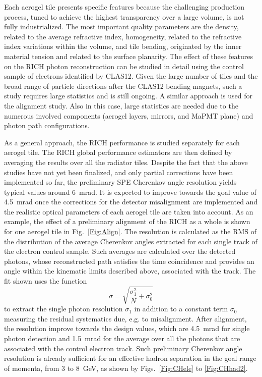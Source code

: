 \documentclass[5p,times,twocolumn]{elsarticle}
\begin{document}
Each aerogel tile presents specific features because the challenging production process, tuned to achieve the
highest transparency over a large volume, is not fully industrialized. The most important quality parameters are the
density, related to the average refractive index, homogeneity, related to the refractive index variations within the
volume, and tile bending, originated by the inner material tension and related to the surface planarity. The effect of
these features on the RICH photon reconstruction can be studied in detail using the control sample of electrons
identified by CLAS12. Given the large number of tiles and the broad range of particle directions after the CLAS12
bending magnets, such a study requires large statistics and is still ongoing. A similar approach is used for the
alignment study. Also in this case, large statistics are needed due to the numerous involved components (aerogel
layers, mirrors, and MaPMT plane) and photon path configurations. 

As a general approach, the RICH performance is studied separately for each aerogel tile.
The RICH global performance estimators are then defined by averaging the results over all the
radiator tiles. 
Despite the fact that the above studies have not yet been finalized, and only partial corrections have been
implemented so far, the preliminary SPE Cherenkov angle resolution yields typical values around 6~mrad. It is expected to improve
towards the goal value of 4.5~mrad once the corrections for the detector misalignment are implemented and the
realistic optical parameters of each aerogel tile are taken into account. As an example, the effect of a preliminary
alignment of the RICH as a whole is shown for one aerogel tile in Fig.~\ref{Fig:Align}. The
resolution is calculated as the RMS of the distribution of the average Cherenkov angles extracted for 
each single track of the electron control sample. Such averages are calculated 
over the detected photons, whose reconstructed path satisfies the time coincidence and provides an angle within the 
kinematic limits described above, associated with the track. The fit shown uses the function
$$\sigma = \sqrt{\frac{\sigma_1^2}{N}+\sigma_0^2}$$ to extract the single photon resolution $\sigma_1$ in addition to
a constant term $\sigma_0$ measuring the residual systematics due, e.g. to misalignment.
After alignment, the resolution improve towards
the design values, which are 4.5~mrad for single photon detection and 1.5~mrad for the average over all the photons 
that are associated with the control electron track. Such preliminary Cherenkov angle resolution is already sufficient for an effective hadron
separation in the goal range of momenta, from 3 to 8~GeV, as shown by Figs.~\ref{Fig:CHele} to \ref{Fig:CHhad2}.
\end{document}
